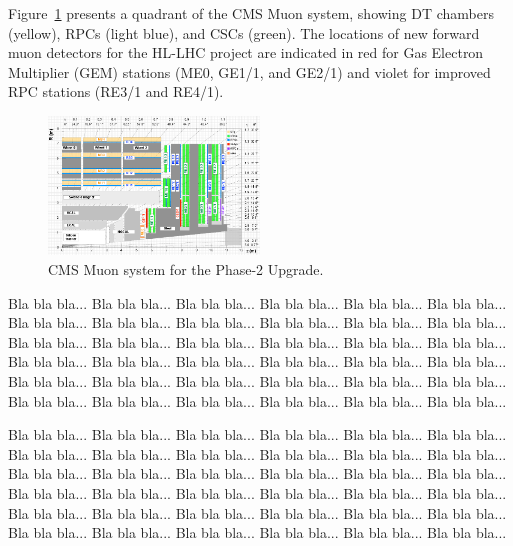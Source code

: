 

Figure~\ref{cms_muon_upgrade} presents a quadrant of the CMS Muon system, showing DT chambers (yellow), RPCs (light blue), and CSCs (green). The locations of new forward muon detectors for the HL-LHC project are indicated in red for Gas Electron Multiplier (GEM) stations (ME0, GE1/1, and GE2/1) and violet for improved RPC stations (RE3/1 and RE4/1).

\begin{figure}
    \includegraphics[width=0.5\textwidth]{uioposter-images/cms_muon}
    \caption{CMS Muon system for the Phase-2 Upgrade.}
    \label{cms_muon_upgrade}
\end{figure}

Bla bla bla... Bla bla bla... Bla bla bla... Bla bla bla... Bla bla bla... Bla bla bla... Bla bla bla... Bla bla bla... Bla bla bla... Bla bla bla... Bla bla bla... Bla bla bla... Bla bla bla... Bla bla bla... Bla bla bla... Bla bla bla... Bla bla bla... Bla bla bla... Bla bla bla... Bla bla bla... Bla bla bla... Bla bla bla... Bla bla bla... Bla bla bla... Bla bla bla... Bla bla bla... Bla bla bla... Bla bla bla... Bla bla bla... Bla bla bla... Bla bla bla... Bla bla bla... Bla bla bla... Bla bla bla... Bla bla bla... Bla bla bla... 

Bla bla bla... Bla bla bla... Bla bla bla... Bla bla bla... Bla bla bla... Bla bla bla... Bla bla bla... Bla bla bla... Bla bla bla... Bla bla bla... Bla bla bla... Bla bla bla... Bla bla bla... Bla bla bla... Bla bla bla... Bla bla bla... Bla bla bla... Bla bla bla... Bla bla bla... Bla bla bla... Bla bla bla... Bla bla bla... Bla bla bla... Bla bla bla... Bla bla bla... Bla bla bla... Bla bla bla... Bla bla bla... Bla bla bla... Bla bla bla... Bla bla bla... Bla bla bla... Bla bla bla... Bla bla bla... Bla bla bla... Bla bla bla... 